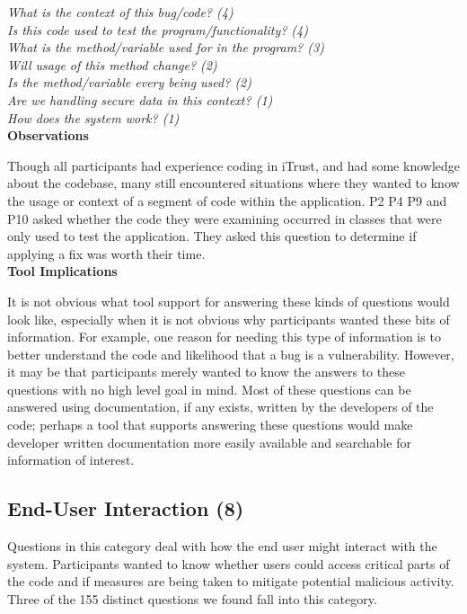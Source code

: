 \documentclass[conference]{IEEEtran}
\begin{document}
\noindent\emph{What is the context of this bug/code? (4)} \\
\emph{Is this code used to test the program/functionality? (4)} \\
\emph{What is the method/variable used for in the program? (3)} \\
\emph{Will usage of this method change? (2)} \\
\emph{Is the method/variable every being used? (2)} \\
\emph{Are we handling secure data in this context? (1)} \\
\emph{How does the system work? (1)} \\



\noindent\textbf{Observations}

Though all participants had experience coding in iTrust, and had some knowledge about the codebase, many still encountered situations where they wanted to know the usage or context of a segment of code within the application. 
P2 P4 P9 and P10 asked whether the code they were examining occurred in classes that were only used to test the application. They asked this question to determine if applying a fix was worth their time.
\\

\noindent\textbf{Tool Implications}

It is not obvious what tool support for answering these kinds of questions would look like, especially when it is not obvious why participants wanted these bits of information. 
For example, one reason for needing this type of information is to better understand the code and likelihood that a bug is a vulnerability. 
However, it may be that participants merely wanted to know the answers to these questions with no high level goal in mind.
Most of these questions can be answered using documentation, if any exists, written by the developers of the code; perhaps a tool that supports answering these questions would make developer written documentation more easily available and searchable for information of interest.



\noindent\subsection{\textbf{End-User Interaction (8)}}
\label{eui}


Questions in this category deal with how the end user might interact with the system. 
Participants wanted to know whether users could access critical parts of the code and if measures are being taken to mitigate potential malicious activity. 
Three of the 155 distinct questions we found fall into this category.
\\
\end{document}
